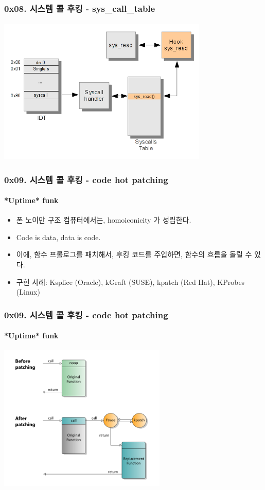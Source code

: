 \begin{frame}
  \frametitle{0x08. 시스템 콜 후킹 - sys\_call\_table}
  \framesubtitle{}

  \begin{center}
    \includegraphics [width=100mm]{img/SSDT_hook_shellstorm_org.png}\cite{memorymanagement}
  \end{center}
\end{frame}

\begin{frame}
  \frametitle{0x09. 시스템 콜 후킹 - code hot patching}
  \framesubtitle{*Uptime* funk}

  \begin{itemize}
  \item <1-> 폰 노이만 구조 컴퓨터에서는, homoiconicity 가 성립한다.
  \item <1-> Code is data, data is code.
  \item <2-> 이에, 함수 프롤로그를 패치해서, 후킹 코드를 주입하면, 함수의 흐름을 돌릴 수 있다.
  \item <3-> 구현 사례: Ksplice (Oracle), kGraft (SUSE), kpatch (Red Hat), KProbes (Linux)
  \end{itemize}
\end{frame}

\begin{frame}
  \frametitle{0x09. 시스템 콜 후킹 - code hot patching}
  \framesubtitle{*Uptime* funk}

  \begin{center}
    \includegraphics [width=80mm]{img/Linux_kernel_live_patching_kpatch.png}\cite{kpatch}
  \end{center}
\end{frame}


